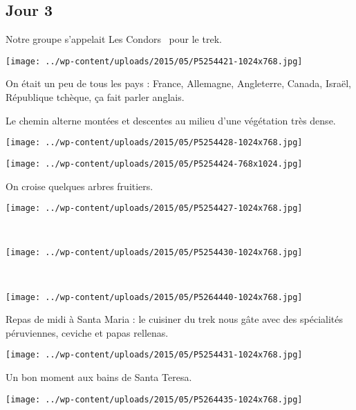 \subsection*{Jour 3}
Notre groupe s'appelait \og Les Condors \fg\ pour le trek. 
\begin{center} \texttt{[image: ../wp-content/uploads/2015/05/P5254421-1024x768.jpg]} \end{center}

On était un peu de tous les pays : France, Allemagne, Angleterre, Canada, Israël, République tchèque, ça fait parler anglais.

Le chemin alterne montées et descentes au milieu d'une végétation très dense. 
\begin{center} \texttt{[image: ../wp-content/uploads/2015/05/P5254428-1024x768.jpg]} \end{center}

\begin{center} \texttt{[image: ../wp-content/uploads/2015/05/P5254424-768x1024.jpg]} \end{center}

On croise quelques arbres fruitiers. 
\begin{center} \texttt{[image: ../wp-content/uploads/2015/05/P5254427-1024x768.jpg]} \end{center}
\vspace{-\topsep}
\pagebreak
~\\
\begin{center} \texttt{[image: ../wp-content/uploads/2015/05/P5254430-1024x768.jpg]} \end{center}
~
\begin{center} \texttt{[image: ../wp-content/uploads/2015/05/P5264440-1024x768.jpg]} \end{center}
\vspace{-\topsep}
\pagebreak

Repas de midi à Santa Maria : le cuisiner du trek nous gâte avec des spécialités péruviennes, ceviche et papas rellenas. 
\begin{center} \texttt{[image: ../wp-content/uploads/2015/05/P5254431-1024x768.jpg]} \end{center}

Un bon moment aux bains de Santa Teresa. 
\begin{center} \texttt{[image: ../wp-content/uploads/2015/05/P5264435-1024x768.jpg]} \end{center}
\vspace{-\topsep}
\pagebreak

